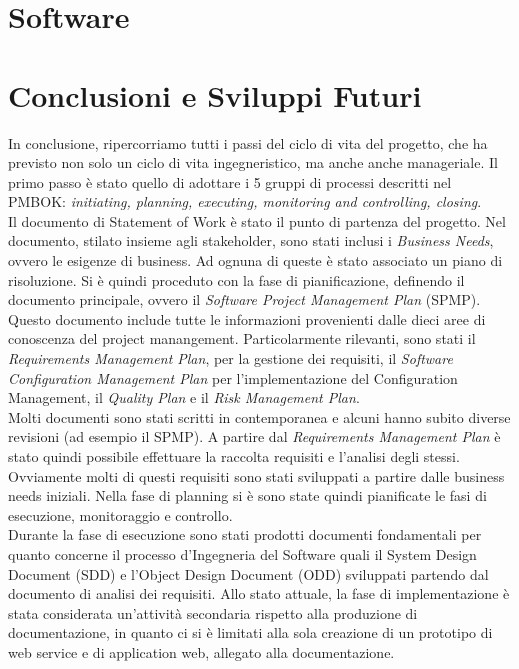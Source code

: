 \documentclass[conference]{IEEEtran}
\begin{document}
\section{Software}
\label{software}



\section{Conclusioni e Sviluppi Futuri}
In conclusione, ripercorriamo tutti i passi del ciclo di vita del progetto, che ha previsto non solo un ciclo di vita ingegneristico, ma anche anche manageriale. Il primo passo \`{e} stato quello di adottare i 5 gruppi di processi descritti nel PMBOK: \emph{initiating, planning, executing, monitoring and controlling, closing}.\\
Il documento di Statement of Work \`{e} stato il punto di partenza del progetto. Nel documento, stilato insieme agli stakeholder, sono stati inclusi i \emph{Business Needs}, ovvero le esigenze di business. Ad ognuna di queste \`{e} stato associato un piano di risoluzione.
Si \`{e} quindi proceduto con la fase di pianificazione, definendo il documento principale, ovvero il \emph{Software Project Management Plan} (SPMP). Questo documento include tutte le informazioni provenienti dalle dieci aree di conoscenza del project manangement. Particolarmente rilevanti, sono stati il \emph{Requirements Management Plan}, per la gestione dei requisiti, il \emph{Software Configuration Management Plan} per l\rq implementazione del Configuration Management, il \emph{Quality Plan} e il \emph{Risk Management Plan}.\\
Molti documenti sono stati scritti in contemporanea e alcuni hanno subito diverse revisioni (ad esempio il SPMP).
A partire dal \emph{Requirements Management Plan} \`{e} stato quindi possibile effettuare la raccolta requisiti e l\rq analisi degli stessi. Ovviamente molti di questi requisiti sono stati sviluppati a partire dalle business needs iniziali. 
Nella fase di planning si \`{e} sono state quindi pianificate le fasi di esecuzione, monitoraggio e controllo.\\
Durante la fase di esecuzione sono stati prodotti documenti fondamentali per quanto concerne il processo d\rq Ingegneria del Software quali il System Design Document (SDD) e l\rq Object Design Document (ODD) sviluppati partendo dal documento di analisi dei requisiti.
Allo stato attuale, la fase di implementazione \`{e} stata considerata un\rq attivit\`{a} secondaria rispetto alla produzione di documentazione, in quanto ci si \`{e} limitati alla sola creazione di un prototipo di web service e di application web, allegato alla documentazione.
\end{document}
